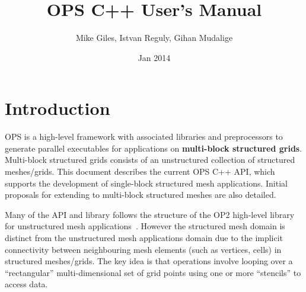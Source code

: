 \documentclass[11pt]{article}
\date{Jan 2014}
\begin{document}
\title{OPS C++ User's Manual}
\author{Mike Giles, Istvan Reguly, Gihan Mudalige}
\maketitle

\newpage


\tableofcontents


\newpage
\section{Introduction}


OPS is a high-level framework with associated libraries and preprocessors to generate parallel executables for
applications on \textbf{multi-block structured grids}. Multi-block structured grids consists of an unstructured
collection of structured meshes/grids. This document describes the current OPS C++ API, which supports the development
of single-block structured mesh applications. Initial proposals for extending to multi-block structured meshes are also
detailed. 

Many of the API and library follows the structure of the OP2 high-level library for unstructured mesh
applications~\cite{op2}. However the structured mesh domain is distinct from the unstructured mesh applications domain
due to the implicit connectivity between neighbouring mesh elements (such as vertices, cells) in structured
meshes/grids. The key idea is that operations involve looping over a ``rectangular'' multi-dimensional set of grid
points using one or more ``stencils'' to access data.\\
\end{document}
